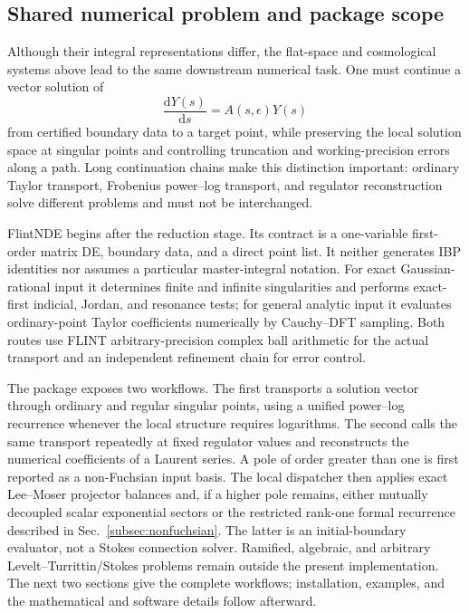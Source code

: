 \documentclass[11pt]{article}
\newcommand{\dd}{\mathrm d}
\newcommand{\eps}{\epsilon}
\renewcommand{\_}{\origunderscore\allowbreak}
\begin{document}
\subsection{Shared numerical problem and package scope}

Although their integral representations differ, the flat-space and cosmological systems
above lead to the same downstream numerical task.  One must continue a vector solution of
\begin{equation}
  \frac{\dd Y(s)}{\dd s}=A(s,\eps)Y(s)
\end{equation}
from certified boundary data to a target point, while preserving the local solution space at
singular points and controlling truncation and working-precision errors along a path.  Long
continuation chains make this distinction important: ordinary Taylor transport, Frobenius
power--log transport, and regulator reconstruction solve different problems and must not be
interchanged.

FlintNDE begins after the reduction stage.  Its contract is a one-variable first-order matrix
DE, boundary data, and a direct point list.  It neither generates IBP identities nor assumes a
particular master-integral notation.  For exact Gaussian-rational input it determines finite
and infinite singularities and performs exact-first indicial, Jordan, and resonance tests;
for general analytic input it evaluates ordinary-point Taylor coefficients numerically by
Cauchy--DFT sampling.  Both routes use FLINT arbitrary-precision complex ball arithmetic for
the actual transport and an independent refinement chain for error control.

The package exposes two workflows.  The first transports a solution vector through ordinary
and regular singular points, using a unified power--log recurrence whenever the local
structure requires logarithms.  The second calls the same transport repeatedly at fixed
regulator values and reconstructs the numerical coefficients of a Laurent series.  A pole of
order greater than one is first reported as a non-Fuchsian input basis.  The local dispatcher
then applies exact Lee--Moser projector balances and, if a
higher pole remains, either mutually decoupled scalar exponential sectors or the restricted
rank-one formal recurrence described in Sec.~\ref{subsec:nonfuchsian}.  The latter is an
initial-boundary evaluator, not a Stokes connection solver.  Ramified, algebraic, and
arbitrary Levelt--Turrittin/Stokes problems remain outside the present implementation.  The next two
sections give the complete workflows; installation, examples, and the mathematical and
software details follow afterward.
\end{document}

